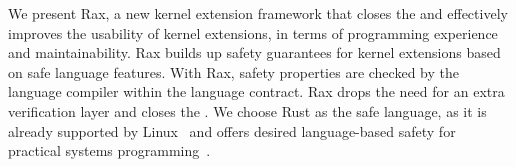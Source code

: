 

We present Rax, a new kernel extension framework that
    closes the \gap{} and effectively improves the usability of kernel extensions,
    in terms of programming experience and maintainability.
Rax builds up safety guarantees for kernel extensions based on safe language features.
With Rax, safety properties are checked by the language compiler within the language contract.
Rax drops the need for an extra verification layer and closes
    the \gap{}.
We choose Rust as the safe language, as it is already supported by Linux~\cite{rust-for-linux-doc}
    and offers desired language-based safety for practical systems programming~\cite{Miller-hotos19,rustSystems,theseus,redleaf}.


%
%

